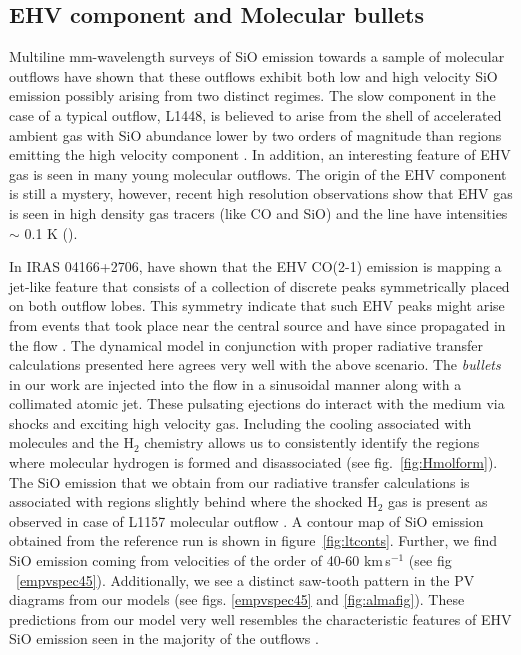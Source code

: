 \documentclass[useAMS,usenatbib]{mn2e}
\begin{document}
\subsection{EHV component and Molecular bullets}
\label{ssec:EHV}
Multiline mm-wavelength surveys of SiO emission towards a sample of molecular
outflows have shown that these outflows exhibit both low and high
velocity SiO emission possibly arising from two distinct regimes. The slow
component in the case of a typical outflow, L1448, is believed to arise from
the shell of accelerated ambient gas with SiO abundance
lower by two orders of magnitude than regions emitting the high
velocity component
\cite{Codella:1999p12584}. In addition, an interesting feature of EHV
gas is seen in many young molecular outflows. The origin of the EHV
component is still a mystery, however, recent high resolution
observations show that EHV gas is seen in
high density gas tracers (like CO and SiO) and the line have
intensities $\sim$ 0.1 K (\citealt{Tafalla:2010p14759}).
%

In IRAS 04166+2706, \cite{SantiagoGarcia:2009p13972} have shown 
that the EHV CO(2-1) emission is mapping a jet-like
feature that consists of a collection of
discrete peaks symmetrically placed on both outflow lobes. This symmetry
indicate that such EHV peaks might arise from events that took place
near the central source and have since propagated in the flow
\citep{Bachiller:1990p11196, Tafalla:2011p14051}. The dynamical 
model in conjunction with proper radiative transfer calculations presented here 
agrees very well with the above scenario. The {\em{bullets}} in our
work are injected into the flow in a sinusoidal manner along with a
collimated atomic jet. These pulsating ejections do interact with the medium
via shocks and exciting high velocity gas. Including the cooling associated with
molecules and the H$_{2}$ chemistry allows us to
consistently identify the regions where molecular hydrogen is formed
and disassociated (see fig.~\ref{fig:Hmolform}). The SiO emission that we
obtain from our radiative transfer calculations is associated with
regions slightly behind where the shocked H$_{2}$ gas is present
as observed in case of L1157 molecular outflow
\cite{Gueth:1998p14058}. A contour map of SiO
emission obtained from the reference run is shown in
figure~\ref{fig:ltconts}. Further, we find SiO emission coming from velocities 
of the order of 40-60 km\,s$^{-1}$ (see fig
~\ref{empvspec45}). Additionally, we see a distinct saw-tooth pattern
in the PV diagrams from our models (see figs. \ref{empvspec45} and
\ref{fig:almafig}). These predictions from our model very well
resembles the characteristic features of EHV SiO emission 
seen in the majority of the outflows \citep{SantiagoGarcia:2009p13972,
  Tafalla:2011p14051, Arce:2013p14902}.
%
\end{document}
